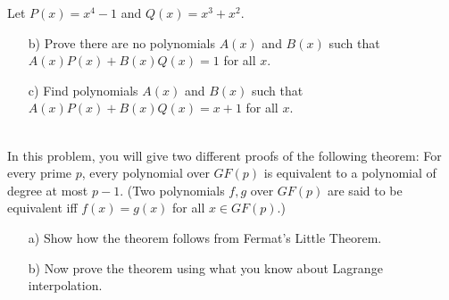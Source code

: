 \documentclass[]{article}
\newif\ifsolutions
\renewcommand{\answer}[1]{{\color{mydarkblue}\textbf{Solution:}#1}}
\begin{document}
\begin{qunlist}
\begin{itemize}
\end{itemize}


Let $P(x) = x^4 - 1$ and $Q(x) = x^3 + x^2$.
\begin{itemize}
\qpart
\item[b)] Prove there are no polynomials $A(x)$ and $B(x)$ such that $A(x) P(x) + B(x) Q(x) = 1$ for all $x$.

\ifsolutions{ \answer {
$gcd(P(x), Q(x)) = x+1$
}}\fi


\qpart
\item[c)] Find polynomials $A(x)$ and $B(x)$ such that $A(x) P(x) + B(x) Q(x) = x + 1$ for all $x$. 

\ifsolutions{ \answer {
\[
A(x)=-(x+1) \quad B(x)=x^2
\]
}}\fi

\end{itemize}






 \\   %
In this problem, you will give two different proofs of the following theorem: For every prime $p$, every polynomial over $GF(p)$ is equivalent to a polynomial of degree at most $p-1$. (Two polynomials $f,g$ over $GF(p)$ are said to be equivalent iff $f(x)=g(x)$ for all $x\in GF(p)$.)

\begin{enumerate}
\qpart
\item[a)] Show how the theorem follows from Fermat's Little Theorem. 
\qpart
\item[b)] Now prove the theorem using what you know about Lagrange interpolation.
\end{enumerate}


\ifsolutions{ \answer {
\begin{itemize}
\item[a)]
From Fermat's Little Theorem, we know $\forall x \not\equiv 0, \text{ } x^{p-1} \equiv 1 \pmod{p}$. \\
Multiplying both sides by $x$, and noting that $0^p \equiv 0 \pmod{p}$, we can see that 
\[
\forall x, \text{ } x^p \equiv x \pmod{p}
\]
Therefore, any $x^k$, where $k \geq p$ will be equivalent to $x^n$, where $n \in \{0, 1, \dots, p-1\}$, and will have a degree at most $p - 1$. 

\item[b)]
Since a polynomial $f$ of degree $d$ is described completely by $d + 1$ points, we cannot specify a polynomial of degree $\geq p$ because $f(p) = f(0)$ (and so forth for other values larger than $p$) over $GF(p)$. Thus, we can only specify at most $p$ unique points. Therefore, every polynomial is equivalent to a polynomial of degree at most $p - 1$.
\end{itemize}
}} \fi






\end{qunlist}
\end{document}
